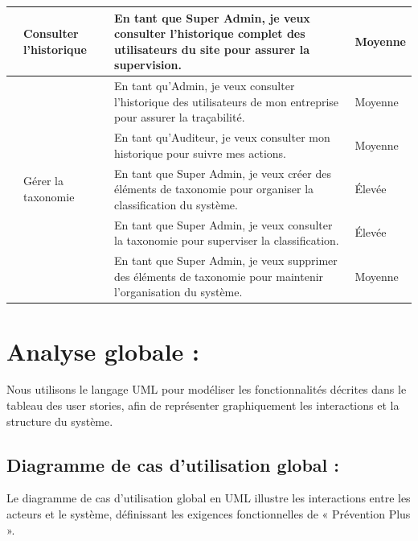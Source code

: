 \begin{longtable}{|>{\raggedright\arraybackslash}p{0.5cm}|>{\raggedright\arraybackslash}p{3cm}|>{\raggedright\arraybackslash}p{8cm}|>{\raggedright\arraybackslash}p{2cm}|}
\hline
17 & Consulter l'historique & En tant que Super Admin, je veux consulter l'historique complet des utilisateurs du site pour assurer la supervision. & Moyenne \\
\cline{3-4}
& & En tant qu'Admin, je veux consulter l'historique des utilisateurs de mon entreprise pour assurer la traçabilité. & Moyenne \\
\cline{3-4}
& & En tant qu'Auditeur, je veux consulter mon historique pour suivre mes actions. & Moyenne \\
\hline
18 & Gérer la taxonomie & En tant que Super Admin, je veux créer des éléments de taxonomie pour organiser la classification du système. & Élevée \\
\cline{3-4}
& & En tant que Super Admin, je veux consulter la taxonomie pour superviser la classification. & Élevée \\
\cline{3-4}
& & En tant que Super Admin, je veux supprimer des éléments de taxonomie pour maintenir l'organisation du système. & Moyenne \\
\hline
\end{longtable}

\section{Analyse globale :}

\noindent Nous utilisons le langage UML pour modéliser les fonctionnalités décrites dans le tableau des user stories, afin de représenter graphiquement les interactions et la structure du système.

\subsection{Diagramme de cas d'utilisation global :}

\noindent Le diagramme de cas d'utilisation global en UML illustre les interactions entre les acteurs et le système, définissant les exigences fonctionnelles de « Prévention Plus ».

